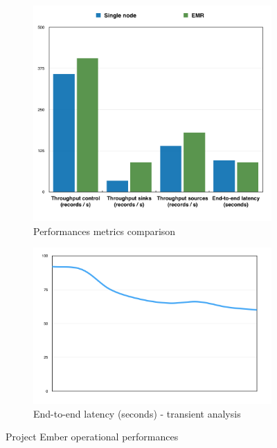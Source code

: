 \begin{figure}
\begin{subfigure}{.5\textwidth}
	\centering
	\includegraphics[scale=0.50]{img/ember_chart}
	\caption{Performances metrics comparison}
	\label{fig:ember_chart}
\end{subfigure}

\begin{subfigure}{.5\textwidth}
	\centering
	\includegraphics[scale=0.50]{img/ember_chart_latency}
	\caption{End-to-end latency (seconds) - transient analysis}
	\label{fig:ember_chart_latency}
\end{subfigure}
\caption{Project Ember operational performances}
\label{fig:ember_metrics}
\end{figure}


